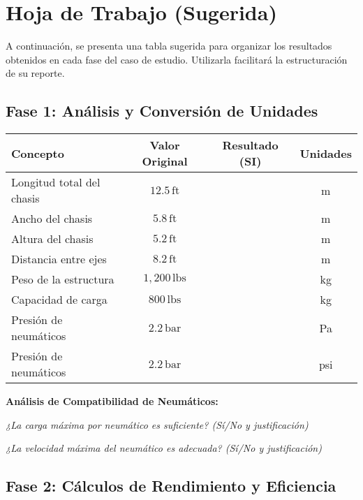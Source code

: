 \documentclass{article}
\begin{document}
\vspace{9cm}




\section*{Hoja de Trabajo (Sugerida)}

A continuación, se presenta una tabla sugerida para organizar los resultados obtenidos en cada fase del caso de estudio. Utilizarla facilitará la estructuración de su reporte.

\subsection*{Fase 1: Análisis y Conversión de Unidades}

\begin{tabular}{|l|c|c|c|}
\hline
\textbf{Concepto} & \textbf{Valor Original} & \textbf{Resultado (SI)} & \textbf{Unidades} \\
\hline
Longitud total del chasis & $12.5 \, \text{ft}$ & & m \\
Ancho del chasis & $5.8 \, \text{ft}$ & & m \\
Altura del chasis & $5.2 \, \text{ft}$ & & m \\
Distancia entre ejes & $8.2 \, \text{ft}$ & & m \\
\hline
Peso de la estructura & $1,200 \, \text{lbs}$ & & kg \\
Capacidad de carga & $800 \, \text{lbs}$ & & kg \\
\hline
Presión de neumáticos & $2.2 \, \text{bar}$ & & Pa \\
Presión de neumáticos & $2.2 \, \text{bar}$ & & psi \\
\hline
\end{tabular}

\vspace{5mm}
\textbf{Análisis de Compatibilidad de Neumáticos:}\vspace{2mm}

\textit{¿La carga máxima por neumático es suficiente? (Sí/No y justificación)}

\hrulefill

\vspace{5mm}
\textit{¿La velocidad máxima del neumático es adecuada? (Sí/No y justificación)}

\hrulefill

\subsection*{Fase 2: Cálculos de Rendimiento y Eficiencia}
\end{document}
